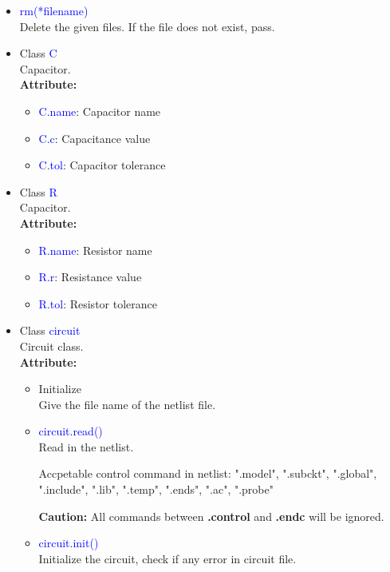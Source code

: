 \documentclass[12pt,a4paper]{article}
\begin{document}
\begin{itemize}[leftmargin=*]
    \item \textcolor{blue}{rm(*filename)}\\
        Delete the given files. If the file does not exist, pass.

    \item Class \textcolor{blue}{C}\\
        Capacitor.\\
        \textbf{Attribute:}
        \begin{itemize}
            \item \textcolor{blue}{C.name}: Capacitor name
            \item \textcolor{blue}{C.c}: Capacitance value
            \item \textcolor{blue}{C.tol}: Capacitor tolerance
        \end{itemize}

    \item Class \textcolor{blue}{R}\\
        Capacitor.\\
        \textbf{Attribute:}
        \begin{itemize}
            \item \textcolor{blue}{R.name}: Resistor name
            \item \textcolor{blue}{R.r}: Resistance value
            \item \textcolor{blue}{R.tol}: Resistor tolerance
        \end{itemize}

    \item Class \textcolor{blue}{circuit}\\
        Circuit class.\\
        \textbf{Attribute:}
        \begin{itemize}
            \item Initialize\\
                Give the file name of the netlist file.
            \item \textcolor{blue}{circuit.read()}\\
                Read in the netlist.

                Accpetable control command in netlist: ".model", ".subckt", ".global", ".include", ".lib", ".temp", ".ends", ".ac", ".probe"

                \textbf{Caution:} All commands between \textbf{.control} and \textbf{.endc} will be ignored.
            \item \textcolor{blue}{circuit.init()}\\
                Initialize the circuit, check if any error in circuit file.


\end{itemize}
\end{itemize}
\end{document}
